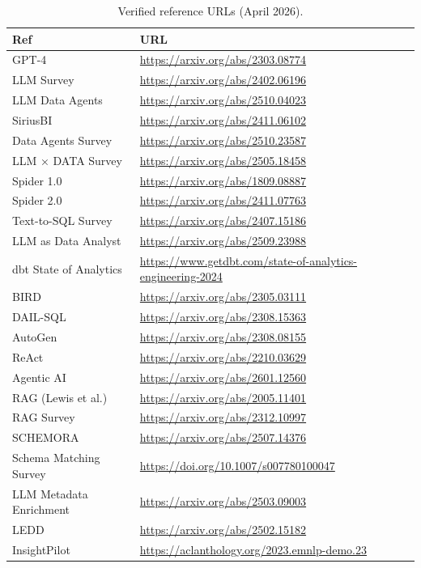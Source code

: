 \documentclass[11pt,a4paper]{article}
\begin{document}
\begin{table}[H]
\centering
\caption{Verified reference URLs (April 2026).}
\small
\begin{tabular}{lp{9.2cm}}
\toprule
\textbf{Ref} & \textbf{URL} \\
\midrule
[1]  GPT-4 & \url{https://arxiv.org/abs/2303.08774} \\
[2]  LLM Survey & \url{https://arxiv.org/abs/2402.06196} \\
[3]  LLM Data Agents & \url{https://arxiv.org/abs/2510.04023} \\
[4]  SiriusBI & \url{https://arxiv.org/abs/2411.06102} \\
[5]  Data Agents Survey & \url{https://arxiv.org/abs/2510.23587} \\
[6]  LLM × DATA Survey & \url{https://arxiv.org/abs/2505.18458} \\
[7]  Spider 1.0 & \url{https://arxiv.org/abs/1809.08887} \\
[8]  Spider 2.0 & \url{https://arxiv.org/abs/2411.07763} \\
[9]  Text-to-SQL Survey & \url{https://arxiv.org/abs/2407.15186} \\
[10] LLM as Data Analyst & \url{https://arxiv.org/abs/2509.23988} \\
[11] dbt State of Analytics & \url{https://www.getdbt.com/state-of-analytics-engineering-2024} \\
[12] BIRD & \url{https://arxiv.org/abs/2305.03111} \\
[13] DAIL-SQL & \url{https://arxiv.org/abs/2308.15363} \\
[14] AutoGen & \url{https://arxiv.org/abs/2308.08155} \\
[15] ReAct & \url{https://arxiv.org/abs/2210.03629} \\
[16] Agentic AI & \url{https://arxiv.org/abs/2601.12560} \\
[17] RAG (Lewis et al.) & \url{https://arxiv.org/abs/2005.11401} \\
[18] RAG Survey & \url{https://arxiv.org/abs/2312.10997} \\
[19] SCHEMORA & \url{https://arxiv.org/abs/2507.14376} \\
[20] Schema Matching Survey & \url{https://doi.org/10.1007/s007780100047} \\
[21] LLM Metadata Enrichment & \url{https://arxiv.org/abs/2503.09003} \\
[22] LEDD & \url{https://arxiv.org/abs/2502.15182} \\
[23] InsightPilot & \url{https://aclanthology.org/2023.emnlp-demo.23} \\

\end{tabular}
\end{table}
\end{document}
